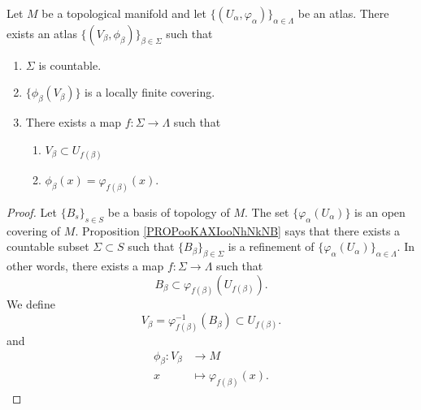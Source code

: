 \begin{proposition}		\label{PROPooYJKOooRwbOXF}
	Let \( M\) be a topological manifold and let \( \{ (U_{\alpha},\varphi_{\alpha}) \}_{\alpha\in \Lambda}\) be an atlas. There exists an atlas \( \{ (V_{\beta}, \phi_{\beta}) \}_{\beta\in\Sigma}\) such that
	\begin{enumerate}
		\item
		      \( \Sigma\) is countable.
		\item
		      \( \{ \phi_{\beta}(V_{\beta}) \}\) is a locally finite covering.
		\item
		      There exists a map \(f \colon \Sigma\to \Lambda  \) such that
		      \begin{enumerate}
			      \item
			            \( V_{\beta}\subset U_{f(\beta)}\)
			      \item
			            \( \phi_{\beta}(x)=\varphi_{f(\beta)}(x)\).
		      \end{enumerate}
	\end{enumerate}
\end{proposition}

\begin{proof}
	Let \( \{ B_s \}_{s\in S}\) be a basis of topology of \( M\). The set \( \{ \varphi_{\alpha}(U_{\alpha}) \}\) is an open covering of \( M\). Proposition \ref{PROPooKAXIooNhNkNB} says that there exists a countable subset \( \Sigma\subset S\) such that \( \{ B_{\beta} \}_{\beta\in \Sigma}\) is a refinement of \( \{ \varphi_{\alpha}(U_{\alpha}) \}_{\alpha\in \Lambda}\). In other words, there exists a map \(f \colon \Sigma\to \Lambda  \) such that
	\begin{equation}
		B_{\beta}\subset \varphi_{f(\beta)}(U_{f(\beta)}).
	\end{equation}
	We define
	\begin{equation}
		V_{\beta}=\varphi_{f(\beta)}^{-1}(B_{\beta})\subset U_{f(\beta)}.
	\end{equation}
	and
	\begin{equation}
		\begin{aligned}
			\phi_{\beta}\colon V_{\beta} & \to M                          \\
			x                            & \mapsto \varphi_{f(\beta)}(x).
		\end{aligned}
	\end{equation}
\end{proof}
